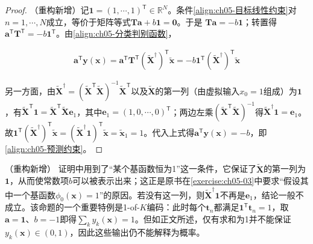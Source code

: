 \documentclass[../../main.tex]{subfiles}
\begin{document}
\begin{proof}
（重构新增）记$\boldsymbol{1}=(1,\cdots,1)^{\mathsf{T}}\in\mathbb{R}^{N}$。条件\eqref{align:ch05-目标线性约束}对$n=1,\cdots,N$成立，等价于矩阵等式$\boldsymbol{T}\boldsymbol{a}+b\boldsymbol{1}=\boldsymbol{0}$。于是
$\boldsymbol{T}\boldsymbol{a}=-b\boldsymbol{1}$；转置得$\boldsymbol{a}^{\mathsf{T}}\boldsymbol{T}^{\mathsf{T}}=-b\boldsymbol{1}^{\mathsf{T}}$。由\eqref{align:ch05-分类判别函数}，

\begin{align}
  \boldsymbol{a}^{\mathsf{T}}\boldsymbol{y}(\boldsymbol{x})=\boldsymbol{a}^{\mathsf{T}}\boldsymbol{T}^{\mathsf{T}}(\tilde{\boldsymbol{X}}^{\dagger})^{\mathsf{T}}\tilde{\boldsymbol{x}}=-b\boldsymbol{1}^{\mathsf{T}}(\tilde{\boldsymbol{X}}^{\dagger})^{\mathsf{T}}\tilde{\boldsymbol{x}}
\end{align}

另一方面，由$\tilde{\boldsymbol{X}}^{\dagger}=(\tilde{\boldsymbol{X}}^{\mathsf{T}}\tilde{\boldsymbol{X}})^{-1}\tilde{\boldsymbol{X}}^{\mathsf{T}}$以及$\tilde{\boldsymbol{X}}$的第一列（由虚拟输入$x_0=1$组成）为$\boldsymbol{1}$，有$\tilde{\boldsymbol{X}}^{\mathsf{T}}\boldsymbol{1}=\tilde{\boldsymbol{X}}^{\mathsf{T}}\tilde{\boldsymbol{X}}\boldsymbol{e}_1$，其中$\boldsymbol{e}_1=(1,0,\cdots,0)^{\mathsf{T}}$；两边左乘$(\tilde{\boldsymbol{X}}^{\mathsf{T}}\tilde{\boldsymbol{X}})^{-1}$得$\tilde{\boldsymbol{X}}^{\dagger}\boldsymbol{1}=\boldsymbol{e}_1$。故$\boldsymbol{1}^{\mathsf{T}}(\tilde{\boldsymbol{X}}^{\dagger})^{\mathsf{T}}\tilde{\boldsymbol{x}}=(\tilde{\boldsymbol{X}}^{\dagger}\boldsymbol{1})^{\mathsf{T}}\tilde{\boldsymbol{x}}=\tilde{\boldsymbol{x}}_1=1$。代入上式得$\boldsymbol{a}^{\mathsf{T}}\boldsymbol{y}(\boldsymbol{x})=-b$，即\eqref{align:ch05-预测约束}。
\end{proof}

\begin{remark}（重构新增）
证明中用到了“某个基函数恒为1”这一条件，它保证了$\tilde{\boldsymbol{X}}$的第一列为$\boldsymbol{1}$，从而使常数项$b$可以被表示出来；这正是原书在\cref{exercise:ch05-03}中要求“假设其中一个基函数$\phi_0(\boldsymbol{x})=1$”的原因。若没有这一列，则$\tilde{\boldsymbol{X}}^{\dagger}\boldsymbol{1}$不再是$\boldsymbol{e}_1$，结论一般不成立。该命题的一个重要特例是1-of-$K$编码：此时每个$\boldsymbol{t}_n$都满足$\boldsymbol{1}^{\mathsf{T}}\boldsymbol{t}_n=1$，取$\boldsymbol{a}=\boldsymbol{1}$、$b=-1$即得$\sum_k y_k(\boldsymbol{x})=1$。但如正文所述，仅有求和为1并不能保证$y_k(\boldsymbol{x})\in(0,1)$，因此这些输出仍不能解释为概率。
\end{remark}
\end{document}
